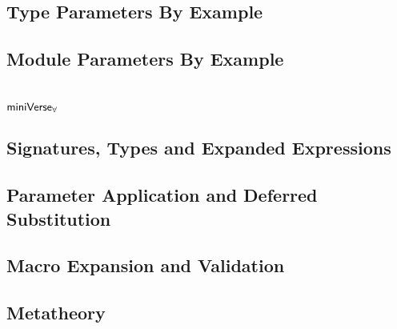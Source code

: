 \subsection{Type Parameters By Example}
\subsection{Module Parameters By Example}
\section{$\mathsf{miniVerse}_{\forall}$}
\subsection{Signatures, Types and Expanded Expressions}
\subsection{Parameter Application and Deferred Substitution}
\subsection{Macro Expansion and Validation}
\subsection{Metatheory}

